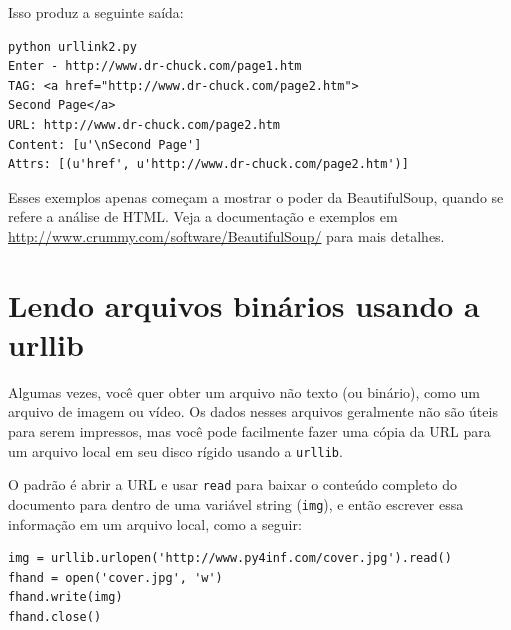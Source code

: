 Isso produz a seguinte saída:

\beforeverb
\begin{verbatim}
python urllink2.py 
Enter - http://www.dr-chuck.com/page1.htm
TAG: <a href="http://www.dr-chuck.com/page2.htm">
Second Page</a>
URL: http://www.dr-chuck.com/page2.htm
Content: [u'\nSecond Page']
Attrs: [(u'href', u'http://www.dr-chuck.com/page2.htm')]
\end{verbatim}
\afterverb

Esses exemplos apenas começam a mostrar o poder da BeautifulSoup,
quando se refere a análise de HTML. Veja a documentação e exemplos
em
\url{http://www.crummy.com/software/BeautifulSoup/} para mais detalhes.

\section{Lendo arquivos binários usando a urllib}

Algumas vezes, você quer obter um arquivo não texto (ou binário), como
um arquivo de imagem ou vídeo. Os dados nesses arquivos geralmente não
são úteis para serem impressos, mas você pode facilmente fazer uma cópia
da URL para um arquivo local em seu disco rígido usando a {\tt urllib}.

O padrão é abrir a URL e usar {\tt read} para baixar o conteúdo completo
do documento para dentro de uma variável string ({\tt img}), e então
escrever essa informação em um arquivo local, como a seguir:

\beforeverb
\begin{verbatim}
img = urllib.urlopen('http://www.py4inf.com/cover.jpg').read()
fhand = open('cover.jpg', 'w')
fhand.write(img)
fhand.close()
\end{verbatim}
\afterverb


